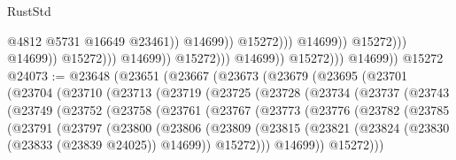 \begin{lexlean}{RustStd}
\begin{coremodule}
                                                              @4812
                                                              @5731
                                                              @16649
                                                              @23461))
                                                          @14699))
                                                      @15272)))
                                                @14699))
                                            @15272)))
                                      @14699))
                                  @15272)))
                            @14699))
                        @15272)))
                  @14699))
              @15272)))
        @14699))
    @15272
@24073 := @23648
    (@23651
      (@23667
        (@23673
          (@23679
            (@23695
              (@23701
                (@23704
                  (@23710
                    (@23713
                      (@23719
                        (@23725
                          (@23728
                            (@23734
                              (@23737
                                (@23743
                                  (@23749
                                    (@23752
                                      (@23758
                                        (@23761
                                          (@23767
                                            (@23773
                                              (@23776
                                                (@23782
                                                  (@23785
                                                    (@23791
                                                      (@23797
                                                        (@23800
                                                          (@23806
                                                            (@23809
                                                              (@23815
                                                                (@23821
                                                                  (@23824
                                                                    (@23830
                                                                      (@23833 (@23839 @24025))
                                                                      @14699))
                                                                  @15272)))
                                                            @14699))
                                                        @15272)))

\end{coremodule}
\end{lexlean}
